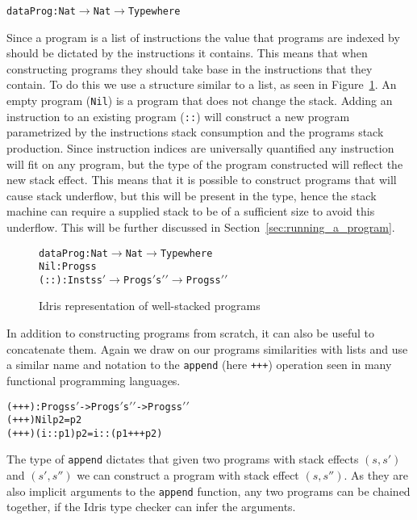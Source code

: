 \begin{alltt}
data Prog : Nat \(\rightarrow\)  Nat \(\rightarrow\)  Type where
\end{alltt}

Since a program is a list of instructions the value that programs are indexed by should be dictated by the instructions it contains. This means that when constructing programs they should take base in the instructions that they contain. To do this we use a structure similar to a list, as seen in Figure~\ref{fig:idris_impl_of_prg}. An empty program (\texttt{Nil}) is a program that does not change the stack. Adding an instruction to an existing program (\texttt{::}) will construct a new program parametrized by the instructions stack consumption and the programs stack production. Since instruction indices are universally quantified any instruction will fit on any program, but the type of the program constructed will reflect the new stack effect. This means that it is possible to construct programs that will cause stack underflow, but this will be present in the type, hence the stack machine can require a supplied stack to be of a sufficient size to avoid this underflow. This will be further discussed in Section~\ref{sec:running_a_program}.

\begin{figure}
\begin{alltt}
data Prog : Nat \(\rightarrow\)  Nat \(\rightarrow\)  Type where
  Nil  : Prog s s
  (::) : Inst s s\('\) \(\rightarrow\)  Prog s\('\) s\('\)\('\) \(\rightarrow\)  Prog s s\('\)\('\)
\end{alltt}
\caption{Idris representation of well-stacked programs}
\label{fig:idris_impl_of_prg}
\end{figure}

In addition to constructing programs from scratch, it can also be useful to concatenate them. Again we draw on our programs similarities with lists and use a similar name and notation to the \texttt{append} (here \texttt{+++}) operation seen in many functional programming languages.

\begin{alltt}
(+++) : Prog s s\('\) -> Prog s\('\) s\('\)\('\) -> Prog s s\('\)\('\)
(+++) Nil p2       = p2
(+++) (i :: p1) p2 = i :: (p1 +++ p2)
\end{alltt}

The type of \texttt{append} dictates that given two programs with stack effects $(s, s')$ and $(s', s'')$ we can construct a program with stack effect $(s, s'')$. As they are also implicit arguments to the \texttt{append} function, any two programs can be chained together, if the Idris type checker can infer the arguments.